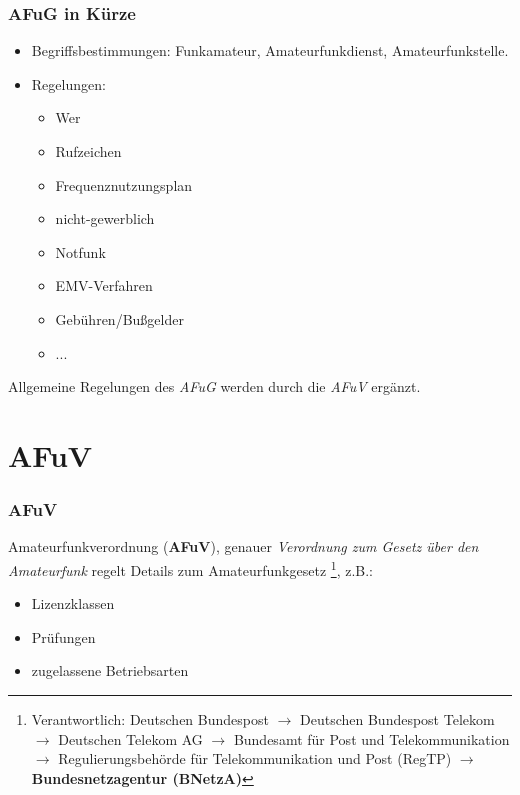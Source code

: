 \begin{frame}
    \frametitle{AFuG in Kürze}

    \begin{itemize}
        \item Begriffsbestimmungen: Funkamateur, Amateurfunkdienst,
              Amateurfunkstelle.
        \item Regelungen:
            \begin{itemize}
                \item Wer
                \item Rufzeichen
                \item Frequenznutzungsplan
                \item nicht-gewerblich
                \item Notfunk
                \item EMV-Verfahren
                \item Gebühren/Bußgelder
                \item ...
            \end{itemize}
    \end{itemize}

    Allgemeine Regelungen des \emph{AFuG} werden durch die \emph{AFuV} ergänzt.

\end{frame}

\section{AFuV}

\begin{frame}
    \frametitle{AFuV}

    Amateurfunkverordnung (\textbf{AFuV}), genauer \emph{Verordnung zum Gesetz
    über den Amateurfunk} regelt Details zum Amateurfunkgesetz
    \footnote{Verantwortlich: Deutschen Bundespost $\rightarrow$ Deutschen
    Bundespost Telekom $\rightarrow$ Deutschen Telekom AG $\rightarrow$
    Bundesamt für Post und Telekommunikation $\rightarrow$ Regulierungsbehörde
    für Telekommunikation und Post (RegTP) $\rightarrow$
    \textbf{Bundesnetzagentur (BNetzA)}}, z.B.:

    \begin{itemize}
        \item Lizenzklassen
        \item Prüfungen
        \item zugelassene Betriebsarten
    \end{itemize}

\end{frame}

